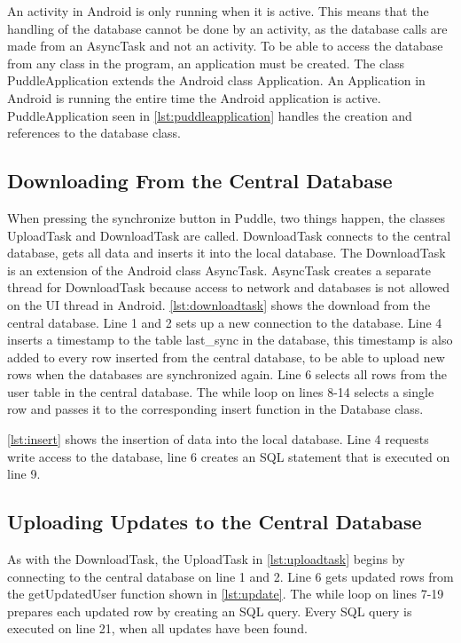 An activity in Android is only running when it is active. This means that the handling of the database cannot be done by an activity, as the database calls are made from an AsyncTask \cite{asynctask} and not an activity. To be able to access the database from any class in the program, an application must be created. The class PuddleApplication extends the Android class Application. An Application in Android is running the entire time the Android application is active. PuddleApplication seen in \autoref{lst:puddleapplication} handles the creation and references to the database class.



\subsection{Downloading From the Central Database}
When pressing the synchronize button in Puddle, two things happen, the classes UploadTask and DownloadTask are called. DownloadTask connects to the central database, gets all data and inserts it into the local database. The DownloadTask is an extension of the Android class AsyncTask. AsyncTask creates a separate thread for DownloadTask because access to network and databases is not allowed on the UI thread in Android.
\autoref{lst:downloadtask} shows the download from the central database. Line 1 and 2 sets up a new connection to the database. Line 4 inserts a timestamp to the table last\_sync in the database, this timestamp is also added to every row inserted from the central database, to be able to upload new rows when the databases are synchronized again. Line 6 selects all rows from the user table in the central database. The while loop on lines 8-14 selects a single row and passes it to the corresponding insert function in the Database class.



\autoref{lst:insert} shows the insertion of data into the local database. Line 4 requests write access to the database, line 6 creates an SQL statement that is executed on line 9.



\subsection{Uploading Updates to the Central Database}
As with the DownloadTask, the UploadTask in \autoref{lst:uploadtask} begins by connecting to the central database on line 1 and 2. Line 6 gets updated rows from the getUpdatedUser function shown in \autoref{lst:update}. The while loop on lines 7-19 prepares each updated row by creating an SQL query. Every SQL query is executed on line 21, when all updates have been found.

